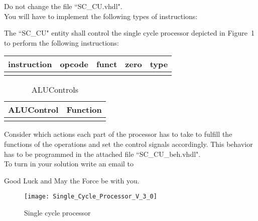 \documentclass[a4paper,12pt]{article}
\newcommand\Tstrut{\rule{0pt}{2.6ex}}       %
\begin{document}
Do not change the file ``SC\_CU.vhdl".\\


You will have to implement the following types of instructions:

The ``SC\_CU" entity shall control the single cycle processor depicted in Figure~1 to perform the following instructions:

\begin{table}[h!]
\centering
    \begin{tabular}{|c|c|c|c|c|} \hline \Tstrut
		instruction & opcode  & funct	& zero & type   \\ \hline \Tstrut
    \hline
    \end{tabular}
\end{table}


\begin{table}[h!]
\centering
    \begin{tabular}{|c|c|} \hline \Tstrut
		ALUControl & Function   \\ \hline \Tstrut
    \hline
    \end{tabular}
    \caption{ALUControls}
    \label{tab:ALUControls}  
\end{table}

Consider which actions each part of the processor has to take to fulfill the functions of the operations and set the control signals accordingly. This behavior has to be programmed in the attached file ``SC\_CU\_beh.vhdl".\\

To turn in your solution write an email to %

\vspace{0.7cm}
Good Luck and May the Force be with you.

\begin{landscape}
\begin{figure}[!h]
\vspace{-0.5cm}
\hspace{-1.8cm}
\texttt{[image: Single\_Cycle\_Processor\_V\_3\_0]}
\caption{Single cycle processor}
\label{fig:SingleCycleProcessor}
\end{figure}
\end{landscape}
\end{document}
